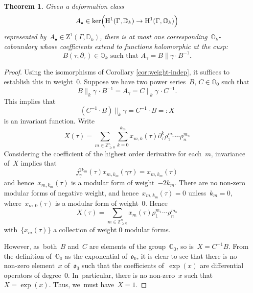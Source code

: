 \documentclass[10pt,a4paper]{article}
\numberwithin{equation}{section}
\let\oldbullet\bullet
\renewcommand{\bullet}{{\scriptscriptstyle\oldbullet}}
\theoremstyle{plain}
\newtheorem{theorem}[theoremcounter]{Theorem}
\theoremstyle{definition}
\newcommand{\tx}{\text}
\newcommand{\nbd}{\nobreakdash-\hspace{0pt}}
\newcommand{\bbD}{\ensuremath{\mathbb{D}}}
\newcommand{\bbO}{\ensuremath{\mathbb{O}}}
\newcommand{\bbZ}{\ensuremath{\mathbb{Z}}}
\newcommand{\frako}{\ensuremath{\mathfrak{o}}}
\newcommand{\rmH}{\ensuremath{\mathrm{H}}}
\newcommand{\rmZ}{\ensuremath{\mathrm{Z}}}
\let\Ga\Gamma
\let\ga\gamma
\begin{document}
\begin{theorem}
\label{thm:uniqueness_of_coboundary}
Given a deformation class
\begin{equation*}
A_\bullet
\in
\ker\Bigl(
\rmH^1(\Ga,\bbD_k)
\to
\rmH^1(\Ga,\bbO_k)
\Bigr)
\end{equation*}
represented by~$A_\bullet \in \rmZ^1(\Ga, \bbD_k)$, there is at most one corresponding~$\bbO_k$\nbd{}coboundary whose coefficients extend to functions holomorphic at the cusp:
\begin{equation*}
B(\tau,\partial_\tau) \in \bbO_k
\tx{\ such that }
A_\ga
=
B \big\| \ga \cdot B^{-1}
\tx{.}
\end{equation*}

\end{theorem}

\begin{proof}
Using the isomorphisms of Corollary \ref{cor:weight-indep}, it suffices to establish this in weight~$0$. Suppose we have two power series~$B,\,C\in\bbO_0$ such that
\begin{equation*}B\big\|_k\ga\,\cdot B^{-1}= A_\ga = C\big\|_k\ga\,\cdot C^{-1}.\end{equation*}
This implies that
\begin{equation*} (C^{-1}\cdot B)\big\|_k\ga = C^{-1}\cdot B =: X\end{equation*}
is an invariant function. Write
\begin{equation*}X(\tau) = \sum_{m\in \bbZ_{\geq 0}^n}\sum_{k=0}^{k_m} x_{m,k}(\tau)\partial_\tau^k \rho_1^{m_1}\cdots \rho_n^{m_n}\end{equation*}
Considering the coefficient of the highest order derivative for each~$m$, invariance of~$X$ implies that
\begin{equation*}j_\ga^{2k_m}(\tau)x_{m,k_m}(\ga\tau)=x_{m,k_m}(\tau)\end{equation*}
and hence~$x_{m,k_m}(\tau)$ is a modular form of weight~$-2k_m$. There are no non-zero modular forms of negative weight, and hence~$x_{m,k_m}(\tau)=0$ unless~$k_m=0$, where~$x_{m,0}(\tau)$ is a modular form of weight~$0$. Hence
\begin{equation*}X(\tau) =\sum_{m\in \bbZ_{\geq 0}^n}x_{m}(\tau)\rho_1^{m_1}\cdots \rho_n^{m_n}\end{equation*}
with~$\{x_{m}(\tau)\}$ a collection of weight 0 modular forms.

However, as~both~$B$ and~$C$ are elements of the group~$\bbO_0$, so is~$X=C^{-1}B$. From the definition of~$\bbO_0$ as the exponential of~$\frako_0$, it is clear to see that there is no non-zero element~$x$ of~$\frako_0$ such that the coefficients of~$\exp(x)$ are differential operators of degree~$0$. In~particular, there is no non-zero~$x$ such that~$X=\exp(x)$. Thus, we~must have~$X=1$.
\end{proof}
\end{document}
